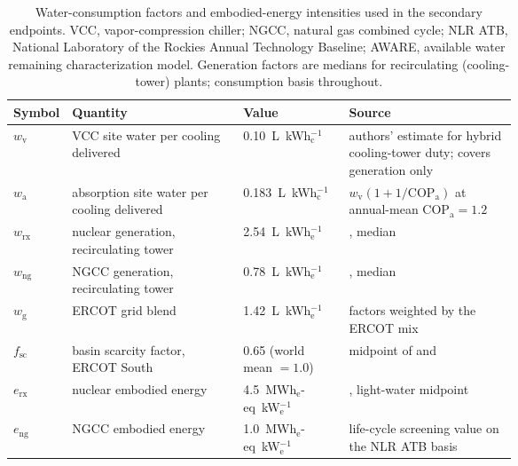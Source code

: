 \documentclass[a4paper,fleqn]{cas-sc}
\begin{document}
\begin{table}[pos=t]
\centering
\caption{Water-consumption factors and embodied-energy intensities used in the secondary endpoints. VCC, vapor-compression chiller; NGCC, natural gas combined cycle; NLR ATB, National Laboratory of the Rockies Annual Technology Baseline; AWARE, available water remaining characterization model. Generation factors are medians for recirculating (cooling-tower) plants; consumption basis throughout.}
\label{tab:endpoint_factors}
\renewcommand{\arraystretch}{1.08}
\begin{tabularx}{\linewidth}{@{}P{0.11\linewidth}P{0.34\linewidth}P{0.21\linewidth}Y@{}}
\toprule
Symbol & Quantity & Value & Source \\
\midrule
$w_\mathrm{v}$  & VCC site water per cooling delivered & 0.10~L~kWh$_\mathrm{c}^{-1}$ & authors' estimate for hybrid cooling-tower duty; \citet{macknick2012water} covers generation only \\
$w_\mathrm{a}$  & absorption site water per cooling delivered & 0.183~L~kWh$_\mathrm{c}^{-1}$ & $w_\mathrm{v}(1+1/\mathrm{COP}_\mathrm{a})$ at annual-mean $\mathrm{COP}_\mathrm{a}=1.2$ \\
$w_\mathrm{rx}$ & nuclear generation, recirculating tower & 2.54~L~kWh$_\mathrm{e}^{-1}$ & \citet{macknick2012water}, median \\
$w_\mathrm{ng}$ & NGCC generation, recirculating tower & 0.78~L~kWh$_\mathrm{e}^{-1}$ & \citet{macknick2012water}, median \\
$w_\mathrm{g}$  & ERCOT grid blend & 1.42~L~kWh$_\mathrm{e}^{-1}$ & \citet{macknick2012water} factors weighted by the ERCOT mix \\
$f_\mathrm{sc}$ & basin scarcity factor, ERCOT South & 0.65 (world mean $=1.0$) & midpoint of \citet{wri2023aqueduct} and \citet{boulay2018aware} \\
$e_\mathrm{rx}$ & nuclear embodied energy & 4.5~MWh$_\mathrm{e}$-eq~kW$_\mathrm{e}^{-1}$ & \citet{lenzen2008nuclear}, light-water midpoint \\
$e_\mathrm{ng}$ & NGCC embodied energy & 1.0~MWh$_\mathrm{e}$-eq~kW$_\mathrm{e}^{-1}$ & life-cycle screening value on the NLR ATB basis \citep{atb2024nuclear} \\
\bottomrule
\end{tabularx}
\end{table}
\end{document}
